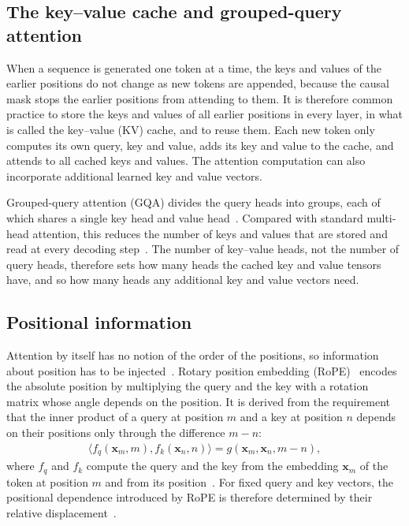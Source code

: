 \subsection{The key--value cache and grouped-query attention}
\label{sec:kv-cache}

When a sequence is generated one token at a time, the keys and values of the earlier positions do not change as new tokens are appended, because the causal mask stops the earlier positions from attending to them. It is therefore common practice to store the keys and values of all earlier positions in every layer, in what is called the key--value (KV) cache, and to reuse them. Each new token only computes its own query, key and value, adds its key and value to the cache, and attends to all cached keys and values. The attention computation can also incorporate additional learned key and value vectors.

Grouped-query attention (GQA) divides the query heads into groups, each of which shares a single key head and value head~\cite{ainslie2023gqa}. Compared with standard multi-head attention, this reduces the number of keys and values that are stored and read at every decoding step~\cite{ainslie2023gqa}. The number of key--value heads, not the number of query heads, therefore sets how many heads the cached key and value tensors have, and so how many heads any additional key and value vectors need.

\subsection{Positional information}
\label{sec:positional}

Attention by itself has no notion of the order of the positions, so information about position has to be injected~\cite{vaswani2017attention}. Rotary position embedding (RoPE)~\cite{su2024roformer} encodes the absolute position by multiplying the query and the key with a rotation matrix whose angle depends on the position. It is derived from the requirement that the inner product of a query at position $m$ and a key at position $n$ depends on their positions only through the difference $m - n$:
\begin{align}
  \big\langle f_q(\mathbf{x}_m, m), f_k(\mathbf{x}_n, n) \big\rangle = g(\mathbf{x}_m, \mathbf{x}_n, m - n),
  \label{eq:rope}
\end{align}
where $f_q$ and $f_k$ compute the query and the key from the embedding $\mathbf{x}_m$ of the token at position $m$ and from its position~\cite{su2024roformer}. For fixed query and key vectors, the positional dependence introduced by RoPE is therefore determined by their relative displacement~\cite{su2024roformer}.


